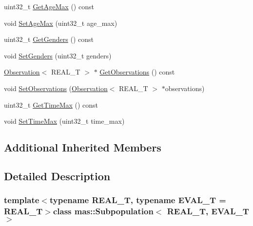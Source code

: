 \begin{DoxyCompactItemize}
\item 
uint32\+\_\+t \hyperlink{classmas_1_1_subpopulation_a55c642990dcf29a5498dc8d2cbfb90a7}{Get\+Age\+Max} () const 
\item 
void \hyperlink{classmas_1_1_subpopulation_a5dd947754968b84d68ea072832f12503}{Set\+Age\+Max} (uint32\+\_\+t age\+\_\+max)
\item 
uint32\+\_\+t \hyperlink{classmas_1_1_subpopulation_a0edecb39baec41b10a839d7eb021721c}{Get\+Genders} () const 
\item 
void \hyperlink{classmas_1_1_subpopulation_af1d3395ddd28daf8d5a0f4de77b923d9}{Set\+Genders} (uint32\+\_\+t genders)
\item 
\hyperlink{classmas_1_1_observation}{Observation}$<$ R\+E\+A\+L\+\_\+\+T $>$ $\ast$ \hyperlink{classmas_1_1_subpopulation_a7de7395f13f44432a35ed2e15ff9c06e}{Get\+Observations} () const 
\item 
void \hyperlink{classmas_1_1_subpopulation_a7458bf12ca5c958b379b56e3da784a81}{Set\+Observations} (\hyperlink{classmas_1_1_observation}{Observation}$<$ R\+E\+A\+L\+\_\+\+T $>$ $\ast$observations)
\item 
uint32\+\_\+t \hyperlink{classmas_1_1_subpopulation_a3b65093d132b0c445482c7027060a4ea}{Get\+Time\+Max} () const 
\item 
void \hyperlink{classmas_1_1_subpopulation_a24707221e6f23e75eaded822e0bbc308}{Set\+Time\+Max} (uint32\+\_\+t time\+\_\+max)
\end{DoxyCompactItemize}
\subsection*{Additional Inherited Members}


\subsection{Detailed Description}
\subsubsection*{template$<$typename R\+E\+A\+L\+\_\+\+T, typename E\+V\+A\+L\+\_\+\+T = R\+E\+A\+L\+\_\+\+T$>$class mas\+::\+Subpopulation$<$ R\+E\+A\+L\+\_\+\+T, E\+V\+A\+L\+\_\+\+T $>$}

